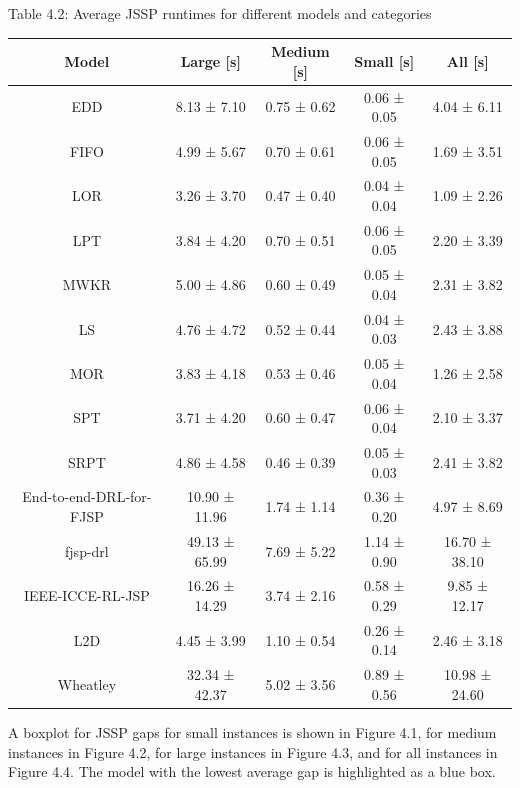 \begin{table}
    Table 4.2: Average JSSP runtimes for different models and categories\\
    \vspace{1mm}
    \label{table:4.2}
    \small
    \begin{tabular}{ccccc}
        \toprule
        Model & Large [s] & Medium [s] & Small [s] & All [s] \\
        \midrule
        EDD & 8.13 ± 7.10 & 0.75 ± 0.62 & 0.06 ± 0.05 & 4.04 ± 6.11 \\
        FIFO & 4.99 ± 5.67 & 0.70 ± 0.61 & 0.06 ± 0.05 & 1.69 ± 3.51 \\
        LOR & 3.26 ± 3.70 & 0.47 ± 0.40 & 0.04 ± 0.04 & 1.09 ± 2.26 \\
        LPT & 3.84 ± 4.20 & 0.70 ± 0.51 & 0.06 ± 0.05 & 2.20 ± 3.39 \\
        MWKR & 5.00 ± 4.86 & 0.60 ± 0.49 & 0.05 ± 0.04 & 2.31 ± 3.82 \\
        LS & 4.76 ± 4.72 & 0.52 ± 0.44 & 0.04 ± 0.03 & 2.43 ± 3.88 \\
        MOR & 3.83 ± 4.18 & 0.53 ± 0.46 & 0.05 ± 0.04 & 1.26 ± 2.58 \\
        SPT & 3.71 ± 4.20 & 0.60 ± 0.47 & 0.06 ± 0.04 & 2.10 ± 3.37 \\
        SRPT & 4.86 ± 4.58 & 0.46 ± 0.39 & 0.05 ± 0.03 & 2.41 ± 3.82 \\
        End-to-end-DRL-for-FJSP & 10.90 ± 11.96 & 1.74 ± 1.14 & 0.36 ± 0.20 & 4.97 ± 8.69 \\
        fjsp-drl & 49.13 ± 65.99 & 7.69 ± 5.22 & 1.14 ± 0.90 & 16.70 ± 38.10 \\
        IEEE-ICCE-RL-JSP & 16.26 ± 14.29 & 3.74 ± 2.16 & 0.58 ± 0.29 & 9.85 ± 12.17 \\
        L2D & 4.45 ± 3.99 & 1.10 ± 0.54 & 0.26 ± 0.14 & 2.46 ± 3.18 \\
        Wheatley & 32.34 ± 42.37 & 5.02 ± 3.56 & 0.89 ± 0.56 & 10.98 ± 24.60 \\
        \bottomrule
        \end{tabular}        
\end{table}

A boxplot for JSSP gaps for small instances is shown in Figure 4.1, for medium instances in Figure 4.2, for large instances in Figure 4.3, and for all instances in Figure 4.4. The model with the lowest average gap is highlighted as a blue box.

